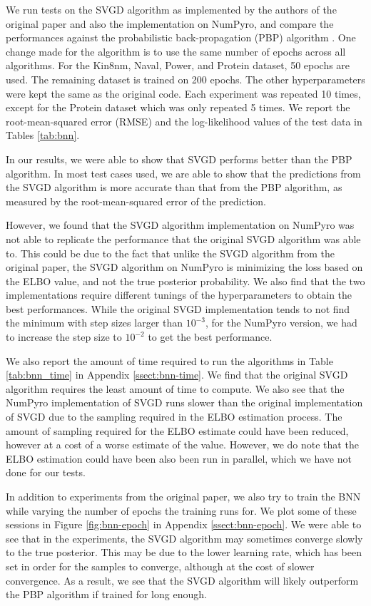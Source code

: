 We run tests on the SVGD algorithm as implemented by the authors of the original paper and also the implementation on NumPyro, and compare the performances against the probabilistic back-propagation (PBP) algorithm \cite{pbp}. One change made for the algorithm is to use the same number of epochs across all algorithms. For the Kin8nm, Naval, Power, and Protein dataset, 50 epochs are used. The remaining dataset is trained on 200 epochs. The other hyperparameters were kept the same as the original code. Each experiment was repeated 10 times, except for the Protein dataset which was only repeated 5 times. We report the root-mean-squared error (RMSE) and the log-likelihood values of the test data in Tables \ref{tab:bnn}. 



In our results, we were able to show that SVGD performs better than the PBP algorithm. In most test cases used, we are able to show that the predictions from the SVGD algorithm is more accurate than that from the PBP algorithm, as measured by the root-mean-squared error of the prediction. 

However, we found that the SVGD algorithm implementation on NumPyro was not able to replicate the performance that the original SVGD algorithm was able to. This could be due to the fact that unlike the SVGD algorithm from the original paper, the SVGD algorithm on NumPyro is minimizing the loss based on the ELBO value, and not the true posterior probability. We also find that the two implementations require different tunings of the hyperparameters to obtain the best performances. While the original SVGD implementation tends to not find the minimum with step sizes larger than $10^{-3}$, for the NumPyro version, we had to increase the step size to $10^{-2}$ to get the best performance. 

We also report the amount of time required to run the algorithms in Table \ref{tab:bnn_time} in Appendix \ref{ssect:bnn-time}. We find that the original SVGD algorithm requires the least amount of time to compute. We also see that the NumPyro implementation of SVGD runs slower than the original implementation of SVGD due to the sampling required in the ELBO estimation process. The amount of sampling required for the ELBO estimate could have been reduced, however at a cost of a worse estimate of the value. However, we do note that the ELBO estimation could have been also been run in parallel, which we have not done for our tests.

In addition to experiments from the original paper, we also try to train the BNN while varying the number of epochs the training runs for. We plot some of these sessions in Figure \ref{fig:bnn-epoch} in Appendix \ref{ssect:bnn-epoch}. We were able to see that in the experiments, the SVGD algorithm may sometimes converge slowly to the true posterior. This may be due to the lower learning rate, which has been set in order for the samples to converge, although at the cost of slower convergence. As a result, we see that the SVGD algorithm will likely outperform the PBP algorithm if trained for long enough.